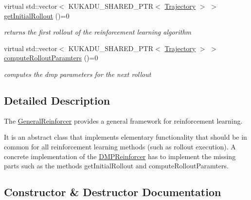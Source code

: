 \begin{DoxyCompactItemize}
\item 
virtual std\+::vector$<$ K\+U\+K\+A\+D\+U\+\_\+\+S\+H\+A\+R\+E\+D\+\_\+\+P\+TR$<$ \hyperlink{classkukadu_1_1Trajectory}{Trajectory} $>$ $>$ \hyperlink{classkukadu_1_1GeneralReinforcer_aa7e72994ca8c009d1331129480d2e49f}{get\+Initial\+Rollout} ()=0\hypertarget{classkukadu_1_1GeneralReinforcer_aa7e72994ca8c009d1331129480d2e49f}{}\label{classkukadu_1_1GeneralReinforcer_aa7e72994ca8c009d1331129480d2e49f}

\begin{DoxyCompactList}\small\item\em returns the first rollout of the reinforcement learning algorithm \end{DoxyCompactList}\item 
virtual std\+::vector$<$ K\+U\+K\+A\+D\+U\+\_\+\+S\+H\+A\+R\+E\+D\+\_\+\+P\+TR$<$ \hyperlink{classkukadu_1_1Trajectory}{Trajectory} $>$ $>$ \hyperlink{classkukadu_1_1GeneralReinforcer_aec3cde390852d93c52a01926bbc6feb3}{compute\+Rollout\+Paramters} ()=0\hypertarget{classkukadu_1_1GeneralReinforcer_aec3cde390852d93c52a01926bbc6feb3}{}\label{classkukadu_1_1GeneralReinforcer_aec3cde390852d93c52a01926bbc6feb3}

\begin{DoxyCompactList}\small\item\em computes the dmp parameters for the next rollout \end{DoxyCompactList}\end{DoxyCompactItemize}


\subsection{Detailed Description}
The \hyperlink{classkukadu_1_1GeneralReinforcer}{General\+Reinforcer} provides a general framework for reinforcement learning. 

It is an abstract class that implements elementary functionality that should be in common for all reinforcement learning methods (such as rollout execution). A concrete implementation of the \hyperlink{classkukadu_1_1DMPReinforcer}{D\+M\+P\+Reinforcer} has to implement the missing parts such as the methods get\+Initial\+Rollout and compute\+Rollout\+Paramters. 

\subsection{Constructor \& Destructor Documentation}
